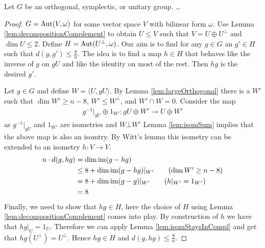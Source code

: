 \begin{lemma}
Let $G$ be an orthogonal, symplectic, or unitary group. \dots
\end{lemma}
\begin{proof}
$G=\operatorname{Aut}(V,\omega)$ for some vector space $V$ with  bilinear form $\omega$. Use Lemma \ref{lem:decompositionComplement} to obtain $U\leq V$ such that $V=U\oplus U^\bot$ and $\dim U\leq2$. Define $H=\operatorname{Aut}(U^\bot,\omega)$. Our aim is to find for any $g\in G$ an $g'\in H$ such that $d(g,g')\leq\frac{8}{n}$.
The idea is to find a map $h\in H$ that behaves like the inverse of $g$ on $gU$ and like the identity on most of the rest. Then $hg$ is the desired $g'$.

Let $g\in G$ and define $W=\langle U,gU\rangle$. By Lemma \ref{lem:largeOrthogonal} there is a $W'$ such that $\dim W'\geq n-8$, $W'\leq W^\bot$, and $W'\cap W=0$. Consider the map
\begin{align*}
 g^{-1}|_{gU}\oplus 1_{W'}\colon gU\oplus W'\to U\oplus W'
\end{align*}
as $g^{-1}|_{gU}$ and $1_{W'}$ are isometries and $W\bot W'$ Lemma \ref{lem:isomSum} implies that the above map is also an isomtry. By Witt's lemma this isometry can be extended to an isometry $h\colon V\to V$. 
\begin{align*}
n\cdot d(g,hg)&=\dim\im (g-hg)\\
&\leq 8+\dim \im(g-hg)|_{W'}\tag{$\dim W'\geq n-8$}\\
&= 8+\dim \im(g-g)|_{W'}\tag{$h|_{W'}=1_{W'}$}\\
&=8
\end{align*}
Finally, we need to show that $hg\in H$, here the choice of $H$ using Lemma \ref{lem:decompositionComplement} comes into play. By construction of $h$ we have that $hg|_U=1_U$. Therefore we can apply Lemma \ref{lem:isomStaysInCompl} and get that $hg(U^\bot)= U^\bot$. Hence $hg\in H$ and $d(g,hg)\leq\frac{8}{n}$.

\end{proof}